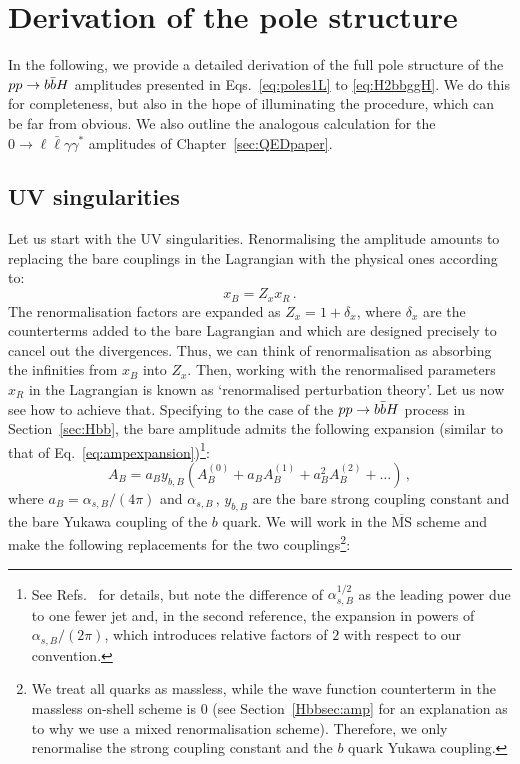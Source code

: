 \documentclass[main.tex]{subfiles}
\begin{document}
\chapter{Derivation of the pole structure} \label{app:polestructure}
In the following, we provide a detailed derivation of the full pole structure of the $pp \rightarrow b\bar{b}H$ amplitudes presented in Eqs.~\ref{eq:poles1L} to \ref{eq:H2bbggH}. We do this for completeness, but also in the hope of illuminating the procedure, which can be far from obvious. We also outline the analogous calculation for the $0\to \ell \bar\ell \gamma \gamma^*$ amplitudes of Chapter~\ref{sec:QEDpaper}.
\section{UV singularities}
Let us start with the UV singularities. Renormalising the amplitude amounts to replacing the bare couplings in the Lagrangian with the physical ones according to:
\begin{equation}
    x_B = Z_x x_R \,.
\end{equation}
The renormalisation factors are expanded as $Z_x = 1 + \delta_x$, where $\delta_x$ are the counterterms added to the bare Lagrangian and which are designed precisely to cancel out the divergences. Thus, we can think of renormalisation as absorbing the infinities from $x_B$ into $Z_x$. Then, working with the renormalised parameters $x_R$ in the Lagrangian is known as `renormalised perturbation theory'. Let us now see how to achieve that. Specifying to the case of the $pp \rightarrow b\bar{b}H$ process in Section~\ref{sec:Hbb}, the bare amplitude admits the following expansion (similar to that of Eq.~\ref{eq:ampexpansion})\footnote{See Refs.~\cite{Ahmed:2014pka, Mondini:2019vub} for details, but note the difference of $\alpha_{s,B}^{1/2}$ as the leading power due to one fewer jet and, in the second reference, the expansion in powers of $\alpha_{s,B}/(2 \pi)$, which introduces relative factors of $2$ with respect to our convention.}:
\begin{equation} \label{eq:ampexpbare}
    A_B = a_B y_{b,B} \left(A_B^{(0)} + a_B A_B^{(1)} + a_B^2 A_B^{(2)} + \ldots \right)\,,
\end{equation}
where $a_B = \alpha_{s,B}/(4\pi)$ and $\alpha_{s,B}\,$,  $y_{b,B}$ are the bare strong coupling constant and the bare Yukawa coupling of the $b$ quark. We will work in the $\overline{\text{MS}}$ scheme and make the following replacements for the two couplings\footnote{We treat all quarks as massless, while the wave function counterterm in the massless on-shell scheme is 0 (see Section~\ref{Hbbsec:amp} for an explanation as to why we use a mixed renormalisation scheme). Therefore, we only renormalise the strong coupling constant and the $b$ quark Yukawa coupling.}:
\end{document}
